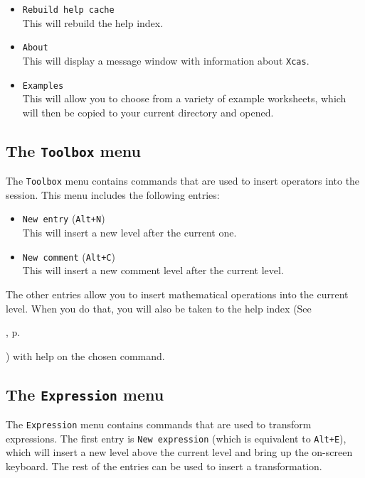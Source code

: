 \documentclass[a4paper,11pt]{book}
\begin{document}
\begin{itemize}
  \item \texttt{Rebuild help cache}\\
  This will rebuild the help index.
  
  \item \texttt{About}\\
  This will display a message window with information about \texttt{Xcas}.
  
  \item \texttt{Examples}\\
  This will allow you to choose from a variety of example worksheets,
  which will then be copied to your current directory and opened.
\end{itemize}

\subsection{The \texttt{Toolbox} menu}

The \texttt{Toolbox} menu contains commands that are used to insert
operators into the session.  This menu includes the following entries: 
\begin{itemize}
  \item \texttt{New entry} (\texttt{Alt+N})\\
  This will insert a new level after the current one.

  \item \texttt{New comment} (\texttt{Alt+C})\\
  This will insert a new comment level after the current level.
\end{itemize}
The other entries allow you to insert mathematical operations into
the current level.  When you do that, you will also be taken to the
help index 
(See 
\begin{latexonly}, p.\pageref{sssec:helpind}\end{latexonly})
with help on the chosen command.

\subsection{The \texttt{Expression} menu}

The \texttt{Expression} menu contains commands that are used to 
transform expressions.  The first entry is \texttt{New expression}
(which is equivalent to \texttt{Alt+E}), 
which will insert a new level above the current level and bring up the
on-screen keyboard.  The rest of the entries can be used to insert a
transformation.
\end{document}
